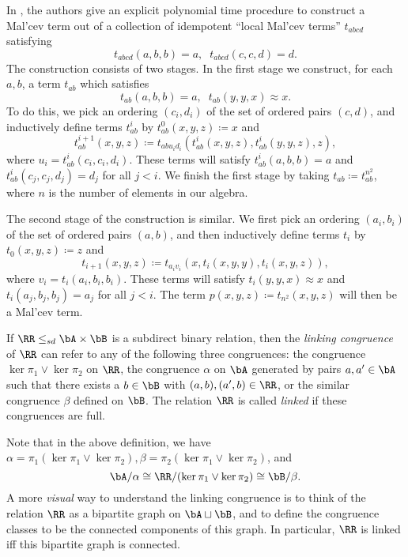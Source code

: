 \begin{rem} In \cite{deciding-minority}, the authors give an explicit polynomial time procedure to construct a Mal'cev term out of a collection of idempotent ``local Mal'cev terms'' $t_{abcd}$ satisfying
\[
t_{abcd}(a,b,b) = a, \;\; t_{abcd}(c,c,d) = d.
\]
The construction consists of two stages. In the first stage we construct, for each $a,b$, a term $t_{ab}$ which satisfies
\[
t_{ab}(a,b,b) = a, \;\; t_{ab}(y,y,x) \approx x.
\]
To do this, we pick an ordering $(c_i,d_i)$ of the set of ordered pairs $(c,d)$, and inductively define terms $t_{ab}^i$ by $t_{ab}^0(x,y,z) \coloneqq x$ and
\[
t_{ab}^{i+1}(x,y,z) \coloneqq t_{abu_id_i}(t_{ab}^i(x,y,z), t_{ab}^i(y,y,z), z),
\]
where $u_i = t_{ab}^i(c_i,c_i,d_i)$. These terms will satisfy $t_{ab}^i(a,b,b) = a$ and $t_{ab}^i(c_j,c_j,d_j) = d_j$ for all $j < i$. We finish the first stage by taking $t_{ab} \coloneqq t_{ab}^{n^2}$, where $n$ is the number of elements in our algebra.

The second stage of the construction is similar. We first pick an ordering $(a_i,b_i)$ of the set of ordered pairs $(a,b)$, and then inductively define terms $t_i$ by $t_0(x,y,z) \coloneqq z$ and
\[
t_{i+1}(x,y,z) \coloneqq t_{a_iv_i}(x,t_i(x,y,y),t_i(x,y,z)),
\]
where $v_i = t_i(a_i,b_i,b_i)$. These terms will satisfy $t_i(y,y,x) \approx x$ and $t_i(a_j,b_j,b_j) = a_j$ for all $j < i$. The term $p(x,y,z) \coloneqq t_{n^2}(x,y,z)$ will then be a Mal'cev term.
\end{rem}

\begin{defn} If $\RR \le_{sd} \bA\times \bB$ is a subdirect binary relation, then the \emph{linking congruence} of $\RR$ can refer to any of the following three congruences: the congruence $\ker \pi_1 \vee \ker \pi_2$ on $\RR$, the congruence $\alpha$ on $\bA$ generated by pairs $a,a' \in \bA$ such that there exists a $b \in \bB$ with $(a,b), (a',b) \in \RR$, or the similar congruence $\beta$ defined on $\bB$. The relation $\RR$ is called \emph{linked} if these congruences are full.
\end{defn}

Note that in the above definition, we have $\alpha = \pi_1(\ker \pi_1 \vee \ker \pi_2), \beta = \pi_2(\ker \pi_1 \vee \ker \pi_2)$, and
\[
\bA/\alpha \cong \RR/(\ker \pi_1 \vee \ker \pi_2) \cong \bB/\beta.
\]
A more \emph{visual} way to understand the linking congruence is to think of the relation $\RR$ as a bipartite graph on $\bA \sqcup \bB$, and to define the congruence classes to be the connected components of this graph. In particular, $\RR$ is linked iff this bipartite graph is connected.


